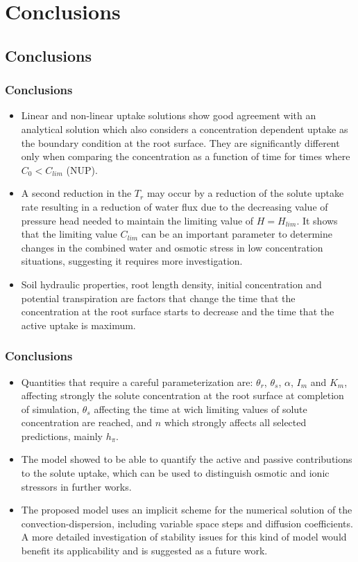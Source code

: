 \section{Conclusions}
\subsection{Conclusions}

\begin{frame}
\frametitle{Conclusions}
\begin{itemize}
\item Linear and non-linear uptake solutions show good agreement with an analytical solution which also considers a concentration dependent uptake as the boundary condition at the root surface.
They are significantly different only when comparing the concentration as a function of time for times where $C_0 < C_{lim}$ (NUP).

\item A second reduction in the $T_r$ may occur by a reduction of the solute uptake rate resulting in a reduction of water flux due to the decreasing value of pressure head needed to maintain the limiting value of $H=H_{lim}$.
It shows that the limiting value $C_{lim}$ can be an important parameter to determine changes in the combined water and osmotic stress in low concentration situations, suggesting it requires more investigation.

\item Soil hydraulic properties, root length density, initial concentration and potential transpiration are factors that change the time that the concentration at the root surface starts to decrease and the time that the active uptake is maximum.
\end{itemize}

\end{frame}

\begin{frame}
\frametitle{Conclusions}
\begin{itemize}
\item Quantities that require a careful parameterization are: $\theta_r$, $\theta_s$, $\alpha$, $I_m$ and $K_m$, affecting strongly the solute concentration at the root surface at completion of simulation, $\theta_s$ affecting the time at wich limiting values of solute concentration are reached, and $n$ which strongly affects all selected predictions, mainly $h_\pi$. 

\item The model showed to be able to quantify the active and passive contributions to the solute uptake, which can be used to distinguish osmotic and ionic stressors in further works.

\item The proposed model uses an implicit scheme for the numerical solution of the convection-dispersion, including variable space steps and diffusion coefficients.
A more detailed investigation of stability issues for this kind of model would benefit its applicability and is suggested as a future work.
\end{itemize}
\end{frame}
